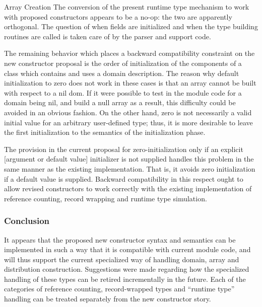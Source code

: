 \begin{chapelexample}{Array Creation}
The conversion of the present runtime type mechanism to work with proposed
constructors appears to be a no-op: the two are apparently orthogonal.  The
question of when fields are initialized and when the type building routines are
called is taken care of by the parser and support code.
\end{chapelexample}

The remaining behavior which places a backward compatibility constraint on the
new constructor proposal is the order of initialization of the components of a
class which contains and uses a domain description.  The reason why default
initialization to zero does not work in these cases is that an array cannot be
built with respect to a nil dom.  If it were possible to test in the module code
for a domain being nil, and build a null array as a result, this difficulty
could be avoided in an obvious fashion.  On the other hand, zero is not
necessarily a valid initial value for an arbitrary user-defined type; thus, it
is more desirable to leave the first initialization to the semantics of the
initialization phase.

The provision in the current proposal for zero-initialization only if an
explicit [argument or default value] initializer is not supplied handles this
problem in the same manner as the existing implementation.  That is, it avoids
zero initialization if a default value is supplied.  Backward compatibility in
this respect ought to allow revised constructors to work correctly with the
existing implementation of reference counting, record wrapping and runtime type
simulation.

\subsubsection{Conclusion}

It appears that the proposed new constructor syntax and semantics can be
implemented in such a way that it is compatible with current module code, and
will thus support the current specialized way of handling domain, array and
distribution construction.  Suggestions were made 
regarding how the specialized handling of these types can be retired
incrementally in the future.  Each of the categories of reference counting,
record-wrapped types and ``runtime type'' handling can be treated separately
from the new constructor story.
